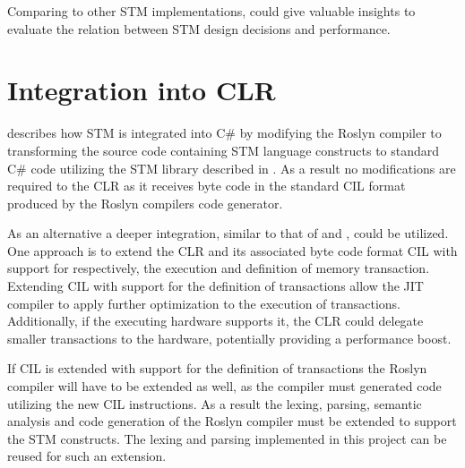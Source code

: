 Comparing \stmname to other \ac{STM} implementations, could give valuable insights to evaluate the relation between \ac{STM} design decisions and performance.

\section{Integration into \acs{CLR}}\label{sec:fut_inte_clr}
 describes how \ac{STM} is integrated into C\# by modifying the Roslyn compiler to transforming the source code containing \ac{STM} language constructs to standard C\# code utilizing the \ac{STM} library described in . As a result no modifications are required to the \ac{CLR} as it receives byte code in the standard \ac{CIL} format produced by the Roslyn compilers code generator.

As an alternative a deeper integration, similar to that of \cite{harris2003language} and \cite{duffy2010stmnet}, could be utilized. One approach is to extend the \ac{CLR} and its associated byte code format \ac{CIL} with support for respectively, the execution and definition of memory transaction. Extending \ac{CIL} with support for the definition of transactions allow the \ac{JIT} compiler to apply further optimization to the execution of transactions. Additionally, if the executing hardware supports it, the \ac{CLR} could delegate smaller transactions to the hardware, potentially providing a performance boost.

If \ac{CIL} is extended with support for the definition of transactions the Roslyn compiler will have to be extended as well, as the compiler must generated code utilizing the new \ac{CIL} instructions. As a result the lexing, parsing, semantic analysis and code generation of the Roslyn compiler must be extended to support the \ac{STM} constructs. The lexing and parsing implemented in this project can be reused for such an extension. 
 
